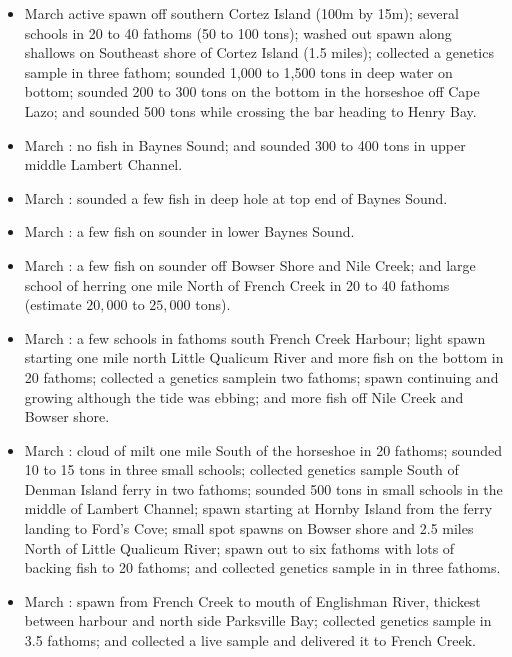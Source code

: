 \begin{itemize}

\item March  active spawn off southern Cortez Island (100m by 15m);
several schools in 20 to 40 fathoms (50 to 100 tons);
washed out spawn along shallows on Southeast shore of Cortez Island (1.5 miles);
collected a genetics sample in three fathom;
sounded 1,000 to 1,500 tons in deep water on bottom;
sounded 200 to 300 tons on the bottom in the horseshoe off Cape Lazo; and
sounded 500 tons while crossing the bar heading to Henry Bay.

\item March : no fish in Baynes Sound; and
sounded 300 to 400 tons in upper middle Lambert Channel.

\item March : sounded a few fish in deep hole at top end of Baynes Sound.

\item March : a few fish on sounder in lower Baynes Sound.

\item March : a few fish on sounder off Bowser Shore and Nile Creek; and
large school of herring one mile North of French Creek in 20 to 40 fathoms
(estimate $20,000$ to $25,000$ tons).

\item March : a few schools in fathoms south French Creek Harbour;
light spawn starting one mile north Little Qualicum River and 
more fish on the bottom in 20 fathoms; 
collected a genetics samplein two fathoms;
spawn continuing and growing although the tide was ebbing; and
more fish off Nile Creek and Bowser shore.

\item March : cloud of milt one mile South
of the horseshoe in 20 fathoms;
sounded 10 to 15 tons in three small schools;
collected genetics sample South of Denman Island ferry in two fathoms;
sounded 500 tons in small schools in the middle of Lambert Channel;
spawn starting at Hornby Island from the ferry landing to Ford's Cove;
small spot spawns on Bowser shore and 2.5 miles North of Little Qualicum River;
spawn out to six fathoms with lots of backing fish to 20 fathoms; and
collected genetics sample in in three fathoms.

\item March : spawn from French Creek to mouth of Englishman River,
thickest between harbour and north side Parksville Bay;
collected genetics sample in 3.5 fathoms; and
collected a live sample and delivered it to French Creek.


\end{itemize}
